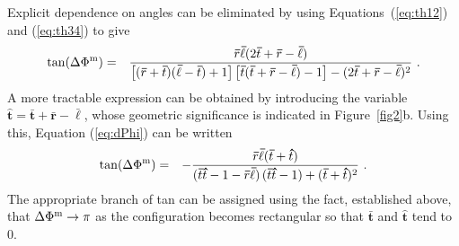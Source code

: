 \documentclass[10pt,namedreferneces]{SolarPhysics}
\begin{document}
\begin{article}
Explicit dependence on angles can be eliminated by using Equations\ (\ref{eq:th12}) and (\ref{eq:th34}) to give 
\begin{eqnarray}
\tan(\Delta\Phi^{\rm m}) &=& {\bm\bar{r}\bm\bar{\ell}(2\bm\bar{t}+\bm\bar{r}-\bm\bar{\ell})\over
  \bigl[(\bm\bar{r}+\bm\bar{t})(\bm\bar{\ell}-\bm\bar{t})+1\bigr]\,\bigl[\bm\bar{t}(\bm\bar{t}+\bm\bar{r}-\bm\bar{\ell})-1\bigr]-
  (2\bm\bar{t}+\bm\bar{r}-\bm\bar{\ell})^2} ~. \label{eq:dPhi} %
\end{eqnarray}
A more tractable expression can be obtained by introducing the variable $\bm\hat{t}=\bm\bar{t}+\bm\bar{r}-\bm\bar{\ell}$, whose geometric significance is indicated in Figure\ \ref{fig2}b.  Using this, Equation  (\ref{eq:dPhi}) can be written
\begin{eqnarray}
\tan(\Delta\Phi^{\rm m}) &=& -{\bm\bar{r}\bm\bar{\ell}(\bm\bar{t}+\bm\hat{t})\over
  (\bm\bar{t}\bm\hat{t} - 1-\bm\bar{r}\bm\bar{\ell})\,(\bm\bar{t}\bm\hat{t} - 1)
  +(\bm\bar{t}+\bm\hat{t})^2} ~. \label{eq:dPhi2}
\end{eqnarray}
The appropriate branch of tan can be assigned using the fact, established above, that $\Delta\Phi^{\rm m}\to\pi$ as the configuration becomes rectangular so that  $\bm\bar{t}$ and $\bm\hat{t}$ tend to $0$.


\end{article}
\end{document}
